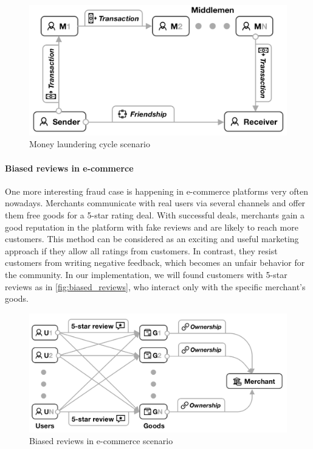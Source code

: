 \begin{figure}[!ht]
    \centering
    \includegraphics[scale=0.3]{figures/mobile_banking.png}
    \caption{Money laundering cycle scenario}
    \label{fig:mobile_banking}
\end{figure}

\paragraph{Biased reviews in e-commerce}

One more interesting fraud case is happening in e-commerce platforms very often nowadays.
Merchants communicate with real users via several channels and offer them free goods for a 5-star rating deal.
With successful deals, merchants gain a good reputation in the platform with fake reviews and are likely to reach more customers.
This method can be considered as an exciting and useful marketing approach if they allow all ratings from customers.
In contrast, they resist customers from writing negative feedback, which becomes an unfair behavior for the community.
In our implementation, we will found customers with 5-star reviews as in \autoref{fig:biased_reviews}, who interact only with the specific merchant's goods.

\begin{figure}[!ht]
    \centering
    \includegraphics[scale=0.3]{figures/biased_reviews.png}
    \caption{Biased reviews in e-commerce scenario}
    \label{fig:biased_reviews}
\end{figure}
